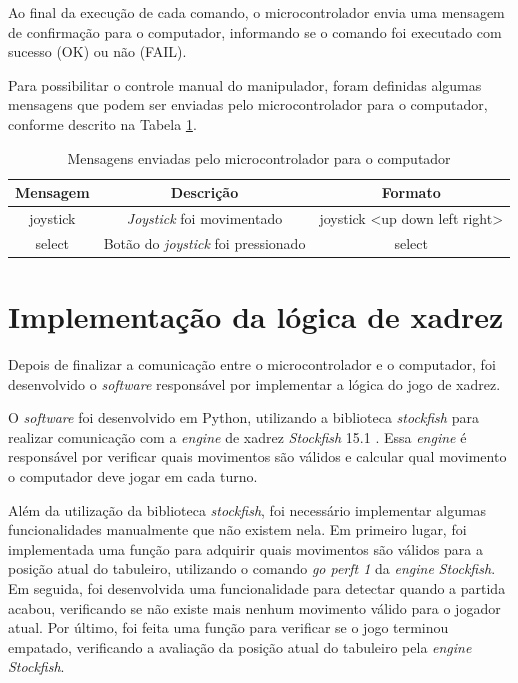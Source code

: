 Ao final da execução de cada comando, o microcontrolador envia uma mensagem de confirmação para o computador, informando se o comando foi executado com sucesso (OK) ou não (FAIL).

Para possibilitar o controle manual do manipulador, foram definidas algumas mensagens que podem ser enviadas pelo microcontrolador para o computador, conforme descrito na Tabela \ref{tab:mensagensMicrocontrolador}.

\begin{table}[H]
    \centering
    \caption{Mensagens enviadas pelo microcontrolador para o computador}
    \begin{tabular}{|c|c|c|}
        \hline
        \textbf{Mensagem} & \textbf{Descrição} & \textbf{Formato} \\
        \hline
        joystick & \textit{Joystick} foi movimentado & joystick <up down left right> \\
        \hline
        select & Botão do \textit{joystick} foi pressionado & select \\
        \hline
    \end{tabular}
    \label{tab:mensagensMicrocontrolador}
\end{table}

\section[Implementação da lógica de xadrez]{Implementação da lógica de xadrez}
\label{sec:implementacaoLogicaXadrez}

Depois de finalizar a comunicação entre o microcontrolador e o computador, foi desenvolvido o \textit{software} responsável por implementar a lógica do jogo de xadrez.

O \textit{software} foi desenvolvido em Python, utilizando a biblioteca \textit{stockfish} \cite{stockfish_python} para realizar comunicação com a \textit{engine} de xadrez \textit{Stockfish} 15.1 \cite{stockfish_engine}.
Essa \textit{engine} é responsável por verificar quais movimentos são válidos e calcular qual movimento o computador deve jogar em cada turno.

Além da utilização da biblioteca \textit{stockfish}, foi necessário implementar algumas funcionalidades manualmente que não existem nela.
Em primeiro lugar, foi implementada uma função para adquirir quais movimentos são válidos para a posição atual do tabuleiro, utilizando o comando \textit{go perft 1} da \textit{engine} \textit{Stockfish}.
Em seguida, foi desenvolvida uma funcionalidade para detectar quando a partida acabou, verificando se não existe mais nenhum movimento válido para o jogador atual.
Por último, foi feita uma função para verificar se o jogo terminou empatado, verificando a avaliação da posição atual do tabuleiro pela \textit{engine} \textit{Stockfish}.

